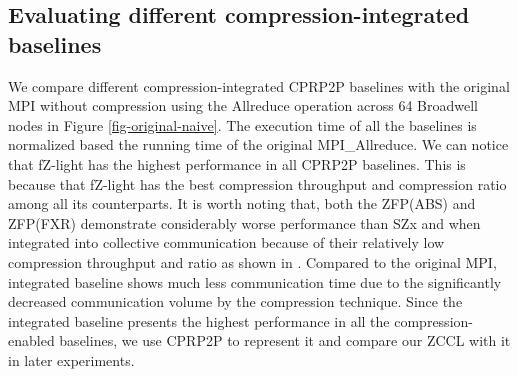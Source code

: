 \begin{table}[ht]
\centering
\caption{Collective communication solutions.}
\label{tab:collective-implementations}
\end{table}




\subsection{Evaluating different compression-integrated baselines}
\label{sec:evaluate_different_compression-integrated_baselines}
We compare different compression-integrated CPRP2P baselines with the original MPI without compression using the Allreduce operation across 64 Broadwell nodes in Figure \ref{fig-original-naive}. The execution time of all the baselines is normalized based the running time of the original MPI\_Allreduce. We can notice that fZ-light has the highest performance in all CPRP2P baselines. This is because that fZ-light has the best compression throughput and compression ratio among all its counterparts. It is worth noting that, both the ZFP(ABS) and ZFP(FXR) demonstrate considerably worse performance than SZx and {\fzlight} when integrated into collective communication because of their relatively low compression throughput and ratio as shown in \cite{huang2023ccoll}. Compared to the original MPI, {\fzlight} integrated baseline shows much less communication time due to the significantly decreased communication volume by the compression technique. Since the {\fzlight} integrated baseline presents the highest performance in all the compression-enabled baselines, we use CPRP2P to represent it and compare our ZCCL with it in later experiments.       

